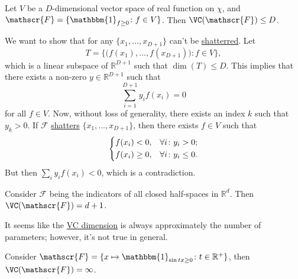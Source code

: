 \begin{eg}
  Let \(V\) be a \(D\)-dimensional vector space of real function on \(\chi \), and \(\mathscr{F} = \{ \mathbbm{1}_{f\geq 0} \colon f \in V\} \). Then \(\VC(\mathscr{F} ) \leq D\).
\end{eg}
\begin{explanation}
  We want to show that for any \(\{ x_1, \dots , x_{D+1} \} \) can't be \hyperref[def:shatter]{shatterred}. Let
  \[
    T = \{ \big( f(x_1), \dots , f(x_{D+1}) \big) \colon f\in V \},
  \]
  which is a linear subspace of \(\mathbb{R} ^{D+1}\) such that \(\dim (T) \leq D\). This implies that there exists a non-zero \(y \in \mathbb{R} ^{D+1}\) such that
  \[
    \sum_{i=1}^{D+1} y_i f(x_i) = 0
  \]
  for all \(f\in V\). Now, without loss of generality, there exists an index \(k\) such that \(y_k > 0\). If \(\mathscr{F} \) \hyperref[def:shatter]{shatters} \(\{ x_1, \dots , x_{D+1} \} \), then there exists \(f\in V\) such that
  \[
    \begin{dcases}
      f(x_i) < 0,    & \forall i\colon y_i > 0  ;  \\
      f(x_i) \geq 0, & \forall i\colon y_i \leq 0.
    \end{dcases}
  \]
  But then \(\sum_{i} y_i f(x_i) < 0\), which is a contradiction.
\end{explanation}

\begin{eg}
  Consider \(\mathscr{F} \) being the indicators of all closed half-spaces in \(\mathbb{R} ^d\). Then \(\VC(\mathscr{F} ) = d+1 \).
\end{eg}

It seems like the \hyperref[def:VC-dimension]{VC dimension} is always approximately the number of parameters; however, it's not true in general.

\begin{eg}
  Consider \(\mathscr{F} = \{ x \mapsto \mathbbm{1}_{\sin tx \geq 0} \colon t \in \mathbb{R} ^+\} \), then \(\VC(\mathscr{F} ) = \infty \).
\end{eg}